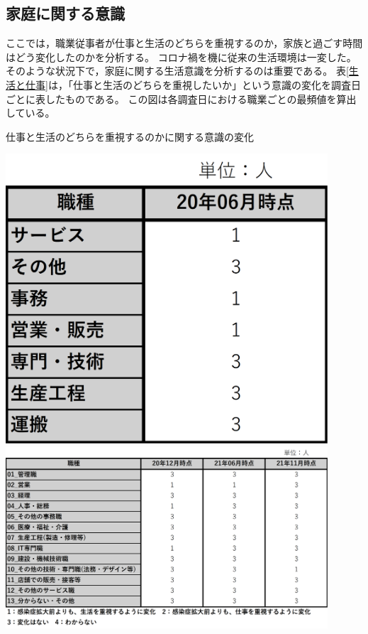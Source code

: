 \documentclass[paper={210mm,297mm},fontsize=15Q,line_length=35zw,number_of_lines=31,head_space=30mm,gutter=40mm,baselineskip=2.0zw,headfoot_verticalposition=1.5zw]{jlreq}
\begin{document}
\subsection{家庭に関する意識}

ここでは，職業従事者が仕事と生活のどちらを重視するのか，家族と過ごす時間はどう変化したのかを分析する。
コロナ禍を機に従来の生活環境は一変した。
そのような状況下で，家庭に関する生活意識を分析するのは重要である。
表\ref{生活と仕事}は，「仕事と生活のどちらを重視したいか」という意識の変化を調査日ごとに表したものである。
この図は各調査日における職業ごとの最頻値を算出している。

\begin{table}[H]
  \centering
  \caption{仕事と生活のどちらを重視するのかに関する意識の変化}
  \includegraphics[width=120mm]{../Figure/c05s02_table_仕事と生活のどちらかを重視するのかに関する意識-01.png}
  \includegraphics[width=120mm]{../Figure/c05s02_table_仕事と生活のどちらかを重視するのかに関する意識-02.png}
  \label{生活と仕事}
\end{table}
\end{document}
